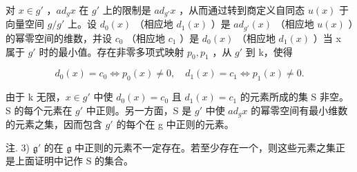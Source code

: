 对 \(x \in g'\) ，\(ad_{g}x\) 在 \(g'\) 上的限制是 \(ad_{g'}x\) ，从而通过转到商定义自同态 \(u(x)\) 于向量空间 \(g/g'\) 上。设 \(d_{0}(x)\) （相应地 \(d_{1}(x)\) ）是 \(ad_{g'}(x)\) （相应地 \(u(x)\) ）的幂零空间的维数，并设 \(c_{0}\) （相应地 \(c_{1}\) ）是 \(d_{0}(x)\) （相应地 \(d_{1}(x)\) ）当 x 属于 \(g'\) 时的最小值。存在非零多项式映射 \(p_{0}, p_{1}\) ，从 \(g'\) 到 k，使得

\[
d _ {0} (x) = c _ {0} \Longleftrightarrow p _ {0} (x) \neq 0, \quad d _ {1} (x) = c _ {1} \Longleftrightarrow p _ {1} (x) \neq 0.
\]

由于 k 无限，\(x \in g'\) 中使 \(d_{0}(x) = c_{0}\) 且 \(d_{1}(x) = c_{1}\) 的元素所成的集 S 非空。S 的每个元素在 \(g'\) 中正则。另一方面，S 是 \(g'\) 中使 \(ad_{g}x\) 的幂零空间有最小维数的元素之集，因而包含 \(g'\) 的每个在 g 中正则的元素。

注. 3) \(\mathfrak{g}'\) 的在 \(\mathfrak{g}\) 中正则的元素不一定存在。若至少存在一个，则这些元素之集正是上面证明中记作 S 的集合。

